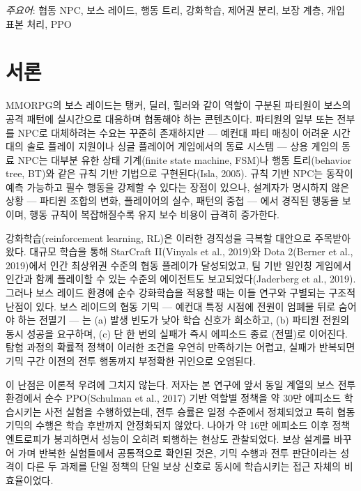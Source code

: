 \documentclass[12pt]{article}      %
\begin{document}
\vspace{1\baselineskip}
\noindent \emph{주요어}: 협동 NPC, 보스 레이드, 행동 트리, 강화학습, 제어권 분리,
보장 계층, 개입 표본 처리, PPO
\clearpage

\section{서론}

MMORPG의 보스 레이드는 탱커, 딜러, 힐러와 같이 역할이 구분된 파티원이 보스의 공격
패턴에 실시간으로 대응하며 협동해야 하는 콘텐츠이다. 파티원의 일부 또는 전부를
NPC로 대체하려는 수요는 꾸준히 존재하지만 --- 예컨대 파티 매칭이 어려운 시간대의
솔로 플레이 지원이나 싱글 플레이어 게임에서의 동료 시스템 --- 상용 게임의 동료
NPC는 대부분 유한 상태 기계(finite state machine, FSM)나 행동 트리(behavior tree,
BT)와 같은 규칙 기반 기법으로 구현된다(Isla, 2005). 규칙 기반 NPC는 동작이 예측
가능하고 필수 행동을 강제할 수 있다는 장점이 있으나, 설계자가 명시하지 않은 상황
--- 파티원 조합의 변화, 플레이어의 실수, 패턴의 중첩 --- 에서 경직된 행동을 보이며,
행동 규칙이 복잡해질수록 유지 보수 비용이 급격히 증가한다.

강화학습(reinforcement learning, RL)은 이러한 경직성을 극복할 대안으로 주목받아
왔다. 대규모 학습을 통해 StarCraft II(Vinyals et al., 2019)와 Dota 2(Berner et
al., 2019)에서 인간 최상위권 수준의 협동 플레이가 달성되었고, 팀 기반 일인칭
게임에서 인간과 함께 플레이할 수 있는 수준의 에이전트도 보고되었다(Jaderberg et
al., 2019). 그러나 보스 레이드 환경에 순수 강화학습을 적용할 때는 이들 연구와
구별되는 구조적 난점이 있다. 보스 레이드의 협동 기믹 --- 예컨대 특정 시점에 전원이
엄폐물 뒤로 숨어야 하는 전멸기 --- 는 (a) 발생 빈도가 낮아 학습 신호가 희소하고,
(b) 파티원 전원의 동시 성공을 요구하며, (c) 단 한 번의 실패가 즉시 에피소드 종료
(전멸)로 이어진다. 탐험 과정의 확률적 정책이 이러한 조건을 우연히 만족하기는
어렵고, 실패가 반복되면 기믹 구간 이전의 전투 행동까지 부정확한 귀인으로 오염된다.

이 난점은 이론적 우려에 그치지 않는다. 저자는 본 연구에 앞서 동일 계열의 보스 전투
환경에서 순수 PPO(Schulman et al., 2017) 기반 역할별 정책을 약 30만 에피소드
학습시키는 사전 실험을 수행하였는데, 전투 승률은 일정 수준에서 정체되었고 특히
협동 기믹의 수행은 학습 후반까지 안정화되지 않았다. 나아가 약 16만 에피소드 이후
정책 엔트로피가 붕괴하면서 성능이 오히려 퇴행하는 현상도 관찰되었다. 보상 설계를
바꾸어 가며 반복한 실험들에서 공통적으로 확인된 것은, 기믹 수행과 전투 판단이라는
성격이 다른 두 과제를 단일 정책의 단일 보상 신호로 동시에 학습시키는 접근 자체의
비효율이었다.
\end{document}
